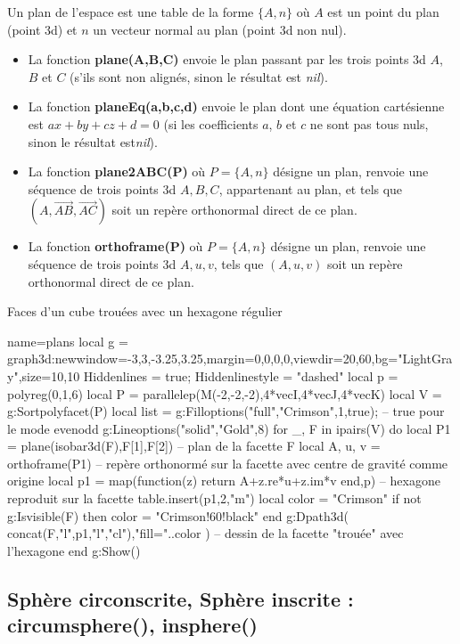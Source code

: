 Un plan de l'espace est une table de la forme $\{A,n\}$ où $A$ est un point du plan (point 3d) et $n$ un vecteur normal au plan (point 3d non nul).
\begin{itemize}
    \item La fonction \textbf{plane(A,B,C)} envoie le plan passant par les trois points 3d $A$, $B$ et $C$ (s'ils sont non alignés, sinon le résultat est \emph{nil}).
    \item La fonction \textbf{planeEq(a,b,c,d)} envoie le plan dont une équation cartésienne est $ax+by+cz+d=0$ (si les coefficients $a$, $b$ et $c$ ne sont pas tous nuls, sinon le résultat est\emph{nil}).
    \item La fonction \textbf{plane2ABC(P)} où $P=\{A,n\}$ désigne un plan, renvoie une séquence de trois points 3d $A,B,C$, appartenant au plan, et tels que $(A,\vec{AB},\vec{AC})$ soit un repère orthonormal direct de ce plan.
    \item La fonction \textbf{orthoframe(P)} où $P=\{A,n\}$ désigne un plan, renvoie une séquence de trois points 3d $A,u,v$, tels que $(A,u,v)$ soit un repère orthonormal direct de ce plan.
\end{itemize}

\begin{demo}{Faces d'un cube trouées avec un hexagone régulier}
\begin{luadraw}{name=plans}
local g = graph3d:new{window={-3,3,-3.25,3.25},margin={0,0,0,0},viewdir={20,60},bg="LightGray",size={10,10}}
Hiddenlines = true; Hiddenlinestyle = "dashed"
local p = polyreg(0,1,6)
local P = parallelep(M(-2,-2,-2),4*vecI,4*vecJ,4*vecK)
local V = g:Sortpolyfacet(P)
local list = {}
g:Filloptions("full","Crimson",1,true); -- true pour le mode evenodd
g:Lineoptions("solid","Gold",8)
for _, F in  ipairs(V) do
    local P1 = plane(isobar3d(F),F[1],F[2]) -- plan de la facette F
    local A, u, v = orthoframe(P1)  -- repère orthonormé sur la facette avec centre de gravité comme origine
    local p1 = map(function(z) return A+z.re*u+z.im*v end,p) -- hexagone reproduit sur la facette
    table.insert(p1,2,"m")
    local color = "Crimson"
    if not g:Isvisible(F) then  color = "Crimson!60!black" end
    g:Dpath3d( concat(F,{"l"},p1,{"l","cl"}),"fill="..color ) -- dessin de la facette "trouée" avec l'hexagone
end
g:Show()
\end{luadraw}
\end{demo}

\subsection{Sphère circonscrite, Sphère inscrite : circumsphere(), insphere()}

